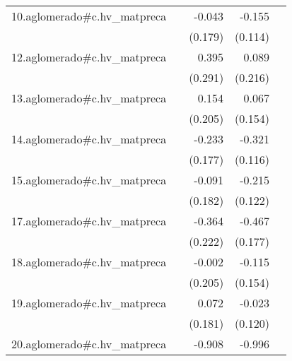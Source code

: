 {\begin{longtable}{l*{4}{D{.}{.}{-1}}}
\addlinespace
10.aglomerado#c.hv\_matpreca&                     &      -0.043         &      -0.155         &                     \\
            &                     &     (0.179)         &     (0.114)         &                     \\
\addlinespace
12.aglomerado#c.hv\_matpreca&                     &       0.395         &       0.089         &                     \\
            &                     &     (0.291)         &     (0.216)         &                     \\
\addlinespace
13.aglomerado#c.hv\_matpreca&                     &       0.154         &       0.067         &                     \\
            &                     &     (0.205)         &     (0.154)         &                     \\
\addlinespace
14.aglomerado#c.hv\_matpreca&                     &      -0.233         &      -0.321\sym{**} &                     \\
            &                     &     (0.177)         &     (0.116)         &                     \\
\addlinespace
15.aglomerado#c.hv\_matpreca&                     &      -0.091         &      -0.215         &                     \\
            &                     &     (0.182)         &     (0.122)         &                     \\
\addlinespace
17.aglomerado#c.hv\_matpreca&                     &      -0.364         &      -0.467\sym{**} &                     \\
            &                     &     (0.222)         &     (0.177)         &                     \\
\addlinespace
18.aglomerado#c.hv\_matpreca&                     &      -0.002         &      -0.115         &                     \\
            &                     &     (0.205)         &     (0.154)         &                     \\
\addlinespace
19.aglomerado#c.hv\_matpreca&                     &       0.072         &      -0.023         &                     \\
            &                     &     (0.181)         &     (0.120)         &                     \\
\addlinespace
20.aglomerado#c.hv\_matpreca&                     &      -0.908\sym{**} &      -0.996\sym{***}&                     \\

\end{longtable}}
